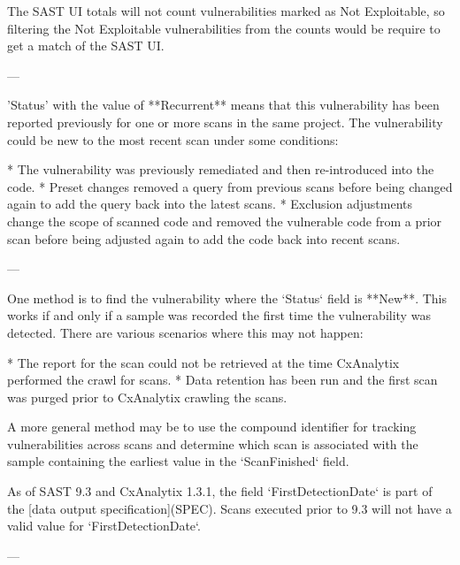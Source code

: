 The SAST UI totals will not count vulnerabilities marked as Not Exploitable, so filtering the Not Exploitable vulnerabilities from the counts would be require to get a match of the SAST UI.

---



'Status' with the value of **Recurrent** means that this vulnerability has been reported previously for one or more scans in the same project.  The vulnerability could be new to the most recent scan under some conditions:

* The vulnerability was previously remediated and then re-introduced into the code.
* Preset changes removed a query from previous scans before being changed again to add the query back into the latest scans.
* Exclusion adjustments change the scope of scanned code and removed the vulnerable code from a prior scan before being adjusted again to add the code back into recent scans.

---


One method is to find the vulnerability where the `Status` field is **New**.  This works if and only if a sample was recorded the first time the vulnerability was detected.  There are various scenarios where this may not happen:

* The report for the scan could not be retrieved at the time CxAnalytix performed the crawl for scans.
* Data retention has been run and the first scan was purged prior to CxAnalytix crawling the scans.

A more general method may be to use the compound identifier for tracking vulnerabilities across scans and determine which scan is associated with the sample containing the earliest value in the `ScanFinished` field.



As of SAST 9.3 and CxAnalytix 1.3.1, the field `FirstDetectionDate` is part of the [data output specification](SPEC).  Scans executed prior to 9.3 will not have a valid value for `FirstDetectionDate`.  

---

